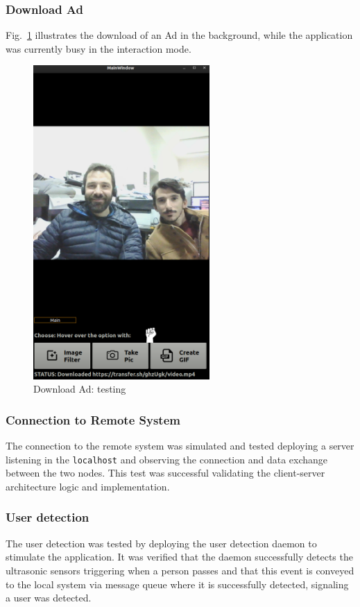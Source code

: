 \subsubsection{Download Ad}
\label{sec:download-ad}
Fig.~\ref{fig:download-test} illustrates the download of an Ad in the
background, while the application was currently busy in the interaction mode.
%
\begin{figure}[htb!]
\centering
    \includegraphics[width=0.6\textwidth]{./img/ui-test-download-ad.png}
  \caption{Download Ad: testing}%
\label{fig:download-test}
\end{figure}


\subsubsection{Connection to Remote System}
\label{sec:conn-remote-syst}
The connection to the remote system was simulated and tested deploying a server
listening in the \texttt{localhost} and observing the connection and data exchange between the two
nodes. This test was successful validating the client-server architecture logic
and implementation.

\subsubsection{User detection}
\label{sec:user-detection}
The user detection was tested by deploying the user detection daemon to
stimulate the application. It was verified that the daemon successfully detects
the ultrasonic sensors triggering when a person passes and that this event is
conveyed to the local system via message queue where it is successfully
detected, signaling a user was detected.

